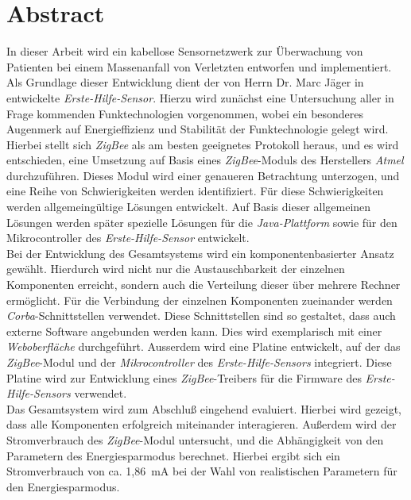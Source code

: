 \chapter*{Abstract}
\begin{small}
In dieser Arbeit wird ein kabellose Sensornetzwerk zur Überwachung von Patienten bei einem 
Massenanfall von Verletzten entworfen und implementiert. Als Grundlage dieser Entwicklung
dient der von Herrn Dr. Marc Jäger in \cite{Marc} entwickelte \emph{Erste-Hilfe-Sensor}.
Hierzu wird zunächst eine Untersuchung aller in Frage kommenden Funktechnologien vorgenommen,
wobei ein besonderes Augenmerk auf Energieffizienz und Stabilität der Funktechnologie gelegt wird.
Hierbei stellt sich \emph{ZigBee} als am besten geeignetes Protokoll heraus, und es wird entschieden,
eine Umsetzung auf Basis eines \emph{ZigBee}-Moduls des Herstellers \emph{Atmel} durchzuführen. 
Dieses Modul wird einer genaueren Betrachtung unterzogen, und eine Reihe von Schwierigkeiten werden
identifiziert. Für diese Schwierigkeiten werden allgemeingültige Lösungen entwickelt. Auf Basis dieser
allgemeinen Lösungen werden später spezielle Lösungen für die \emph{Java-Plattform} sowie für den
Mikrocontroller des \emph{Erste-Hilfe-Sensor} entwickelt.
\\                    
Bei der Entwicklung des Gesamtsystems wird ein komponentenbasierter Ansatz gewählt. Hierdurch wird nicht
nur die Austauschbarkeit der einzelnen Komponenten erreicht, sondern auch die Verteilung dieser über
mehrere Rechner ermöglicht. Für die Verbindung der einzelnen Komponenten zueinander werden 
\emph{Corba}-Schnittstellen verwendet. Diese Schnittstellen sind so gestaltet, dass auch externe
Software angebunden werden kann. Dies wird exemplarisch mit einer \emph{Weboberfläche} durchgeführt.
Ausserdem wird eine Platine entwickelt, auf der das \emph{ZigBee}-Modul und der
\emph{Mikrocontroller} des \emph{Erste-Hilfe-Sensors} integriert. Diese Platine wird zur 
Entwicklung eines \emph{ZigBee}-Treibers für die Firmware des \emph{Erste-Hilfe-Sensors} verwendet.
\\
Das Gesamtsystem wird zum Abschluß eingehend evaluiert. Hierbei wird gezeigt, dass alle Komponenten
erfolgreich miteinander interagieren. Außerdem wird der Stromverbrauch des \emph{ZigBee}-Modul 
untersucht, und die Abhängigkeit von den Parametern des Energiesparmodus berechnet. Hierbei ergibt 
sich ein Stromverbrauch von ca. 1,86~mA bei der Wahl von realistischen Parametern für den 
Energiesparmodus.

\end{small}
